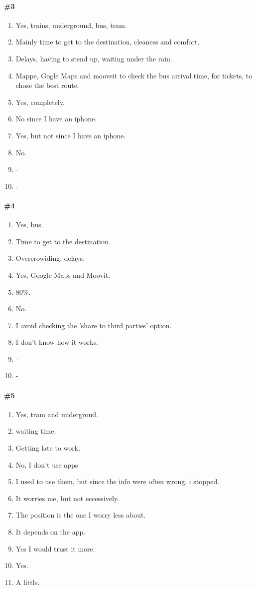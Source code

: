 \documentclass[a4paper, 10pt]{article}
\begin{document}
\paragraph*{\#3}
\begin{enumerate}
    \item Yes, trains, underground, bus, tram.
    \item Mainly time to get to the destination, cleaness and comfort.
    \item Delays, having to stend up, waiting under the rain.
    \item Mappe, Gogle Maps and mooveit to check the bus arrival time,
     for tickets, to chose the best route.
    \item Yes, completely.
    \item No since I have an iphone.
    \item Yes, but not since I have an iphone.
    \item No.
    \item -
    \item -
\end{enumerate}

\paragraph*{\#4}
\begin{enumerate}
    \item Yes, bus.
    \item Time to get to the destination.
    \item Overcrowiding, delays.
    \item Yes, Google Maps and Moovit.
    \item 80\%.
    \item No.
    \item I avoid checking the 'share to third parties' option.
    \item I don't know how it works.
    \item -
    \item -
\end{enumerate}

\paragraph*{\#5}
\begin{enumerate}
    \item Yes, tram and undergroud.
    \item waiting time.
    \item Getting late to work.
    \item No, I don't use apps
    \item I used to use them, but since the info were often wrong, i stopped.
    \item It worries me, but not eccessively.
    \item The position is the one I worry less about.
    \item It depends on the app.
    \item Yes I would trust it more.
    \item Yes.
    \item A little.
\end{enumerate}
\end{document}
